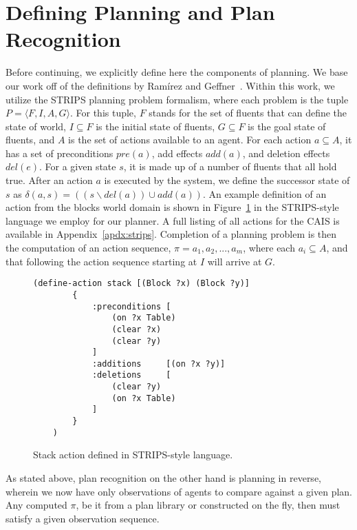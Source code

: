 \section{Defining Planning and Plan Recognition}

Before continuing, we explicitly define here the components of planning. We base our
work off of the definitions by Ramírez and Geffner~\cite{ramirez_plan_2009}.
Within this work, we utilize the STRIPS planning problem formalism, where each problem is the
tuple $P = \langle F, I, A, G \rangle$. For this tuple, $F$ stands for the set of
fluents that can define the state of world, $I \subseteq F$ is the initial state of
fluents, $G \subseteq F$ is the goal state of fluents, and $A$ is the set of actions
available to an agent. For each action $a \subseteq A$, it has a set
of preconditions $pre(a)$, add effects $add(a)$, and deletion effects $del(e)$. For a given state
$s$, it is made up of a number of fluents that all hold true. After an action $a$ is executed
by the system, we define the successor state of $s$ as
$\delta(a, s) = ((s \backslash del(a)) \cup add(a))$. An example definition of an
action from the blocks world domain is shown in Figure~\ref{fig:strips} in the STRIPS-style
language we employ for our planner. A full listing of all actions for the CAIS is available in Appendix~\ref{apdx:strips}. Completion of a planning problem is then the computation of
an action sequence, $\pi = a_{1}, a_{2}, ..., a_{m}$, where each
$a_{i} \subseteq A$, and that following the action sequence starting at $I$
will arrive at $G$.

\begin{figure}[ht]
\begin{lstlisting}[]
    (define-action stack [(Block ?x) (Block ?y)]
        {
            :preconditions [
                (on ?x Table)
                (clear ?x)
                (clear ?y)
            ]
            :additions     [(on ?x ?y)]
            :deletions     [
                (clear ?y)
                (on ?x Table)
            ]
        }
    )
\end{lstlisting}
\caption{Stack action defined in STRIPS-style language.}
\label{fig:strips}
\end{figure}

As stated above, plan recognition on the other hand is planning in reverse,
wherein we now have only observations of agents to compare against a given plan.
Any computed $\pi$, be it from a plan library or constructed on the fly, then
must satisfy a given observation sequence.

